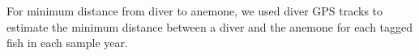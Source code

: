 \documentclass[12pt, oneside]{article}   	%
\begin{document}


For minimum distance from diver to anemone, we used diver GPS tracks to estimate the minimum distance between a diver and the anemone for each tagged fish in each sample year.


\end{document}
